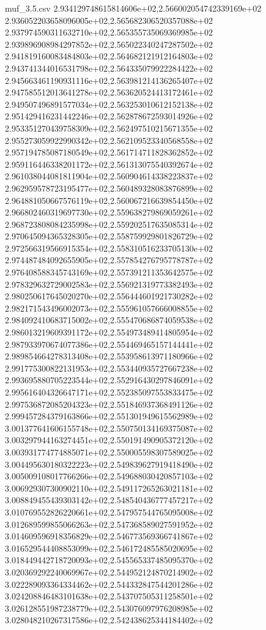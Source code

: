 \begin{filecontents*}{muf_3.5.csv}
2.934129748615814606e+02,2.566002054742339169e+02
2.936052203658096005e+02,2.565682306520357088e+02
2.937974590311632710e+02,2.565355735069369985e+02
2.939896908984297852e+02,2.565022340247287502e+02
2.941819160083484803e+02,2.564682121912164803e+02
2.943741344016531798e+02,2.564335079922284422e+02
2.945663461190931116e+02,2.563981214136265407e+02
2.947585512013641278e+02,2.563620524413172461e+02
2.949507496891577034e+02,2.563253010612152138e+02
2.951429416231442246e+02,2.562878672593014926e+02
2.953351270439758309e+02,2.562497510215671355e+02
2.955273059922990342e+02,2.562109523340568558e+02
2.957194785087180549e+02,2.561714711828362852e+02
2.959116446338201172e+02,2.561313075540392674e+02
2.961038044081811904e+02,2.560904614338223837e+02
2.962959578723195477e+02,2.560489328083876899e+02
2.964881050667576119e+02,2.560067216639854450e+02
2.966802460319697730e+02,2.559638279869059261e+02
2.968723808084235998e+02,2.559202517635085314e+02
2.970645094365328305e+02,2.558759929801826729e+02
2.972566319566915354e+02,2.558310516233705130e+02
2.974487484092655905e+02,2.557854276795778787e+02
2.976408588345743169e+02,2.557391211353642575e+02
2.978329632729002583e+02,2.556921319773382493e+02
2.980250617645020270e+02,2.556444601921730282e+02
2.982171543496002073e+02,2.555961057666008855e+02
2.984092410683715002e+02,2.555470686874059538e+02
2.986013219609391172e+02,2.554973489414805954e+02
2.987933970674077386e+02,2.554469465157144441e+02
2.989854664278313408e+02,2.553958613971180966e+02
2.991775300822131953e+02,2.553440935727667238e+02
2.993695880705223544e+02,2.552916430297846091e+02
2.995616404326647171e+02,2.552385097553833475e+02
2.997536872085204323e+02,2.551846937368491126e+02
2.999457284379163866e+02,2.551301949615562989e+02
3.001377641606155748e+02,2.550750134169375087e+02
3.003297944163274451e+02,2.550191490905372120e+02
3.003931774774885071e+02,2.550005598307589025e+02
3.004495630180322223e+02,2.549839627919418490e+02
3.005009108017766266e+02,2.549688030420857103e+02
3.006929307300902110e+02,2.549117265263021181e+02
3.008849455439303142e+02,2.548540436777457217e+02
3.010769552826220661e+02,2.547957544765095008e+02
3.012689599855066263e+02,2.547368589027591952e+02
3.014609596918356829e+02,2.546773569366741867e+02
3.016529544408853099e+02,2.546172485585020695e+02
3.018449442718720093e+02,2.545565337485095370e+02
3.020369292240069967e+02,2.544952124870214902e+02
3.022289093364334462e+02,2.544332847544201286e+02
3.024208846483101638e+02,2.543707505311258501e+02
3.026128551987238779e+02,2.543076097976208985e+02
3.028048210267317586e+02,2.542438625344184402e+02

\end{filecontents*}
